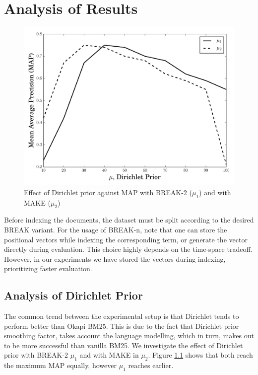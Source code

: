 \chapter{Analysis of Results} %
%
\label{ch:analysis}

\begin{figure}[h]
	\centering
	\includegraphics[width=\textwidth]{gfx/phew.pdf}
	\caption{Effect of Dirichlet prior against MAP with BREAK-2 ($\mu_1$) and with MAKE ($\mu_2$)}
	\label{phew}
\end{figure}

Before indexing the documents, the dataset must be split according to the desired BREAK variant.
For the usage of BREAK-n, note that one can store the positional vectors while indexing the corresponding term, or generate the vector directly during evaluation.
This choice highly depends on the time-space tradeoff.
However, in our experiments we have stored the vectors during indexing, prioritizing faster evaluation. 

\section{Analysis of Dirichlet Prior}

The common trend between the experimental setup is that Dirichlet tends to perform better than Okapi BM25.
This is due to the fact that Dirichlet prior smoothing factor, takes account the language modelling, which in turn, makes out to be more successful than vanilla BM25.
We investigate the effect of Dirichlet prior with BREAK-2 $\mu_1$ and with MAKE in $\mu_2$.
Figure \ref{phew} shows that both reach the maximum MAP equally, however $\mu_1$ reaches earlier.

